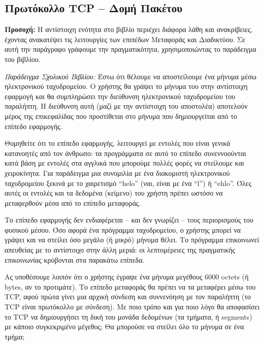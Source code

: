 %
%
\subsection{Πρωτόκολλο TCP -- Δομή Πακέτου}

\begin{inthebox}
\textbf{Προσοχή:} Η αντίστοιχη ενότητα στο βιβλίο περιέχει διάφορα λάθη και ανακρίβειες, έχοντας ανακατέψει τις λειτουργίες των επιπέδων Μεταφοράς και Διαδικτύου. Σε αυτή την παράγραφο γράφουμε την πραγματικότητα, χρησιμοποιώντας το παράδειγμα του βιβλίου.\\
\end{inthebox}


\emph{Παράδειγμα Σχολικού Βιβλίου:} Έστω ότι θέλουμε να αποστείλουμε ένα μήνυμα μέσω ηλεκτρονικού ταχυδρομείου. Ο χρήστης θα γράψει το μήνυμα του στην αντίστοιχη εφαρμογή και θα συμπληρώσει την διεύθυνση ηλεκτρονικού ταχυδρομείου του παραλήπτη. Η διεύθυνση αυτή (μαζί με την αντίστοιχη του αποστολέα) αποτελούν μέρος της επικεφαλίδας που προστίθεται στο μήνυμα που δημιουργείται από το επίπεδο εφαρμογής.

Θυμηθείτε ότι το επίπεδο εφαρμογής, λειτουργεί με εντολές που είναι γενικά κατανοητές από τον άνθρωπο: τα προγράμματα σε αυτό το επίπεδο συνεννοούνται κατά βάση με εντολές στα αγγλικά που μπορούμε πολλές φορές να στείλουμε και χειροκίνητα. Για παράδειγμα μια συνομιλία με ένα διακομιστή ηλεκτρονικού ταχυδρομείου ξεκινά με το χαιρετισμό ``helo'' (ναι, είναι με ένα ``l'') ή ``ehlo''. Όλες αυτές οι εντολές και τα δεδομένα (κείμενο) του χρήστη πρέπει ωστόσο να μεταφερθούν μέσα από το επίπεδο μεταφοράς.

Το επίπεδο εφαρμογής δεν ενδιαφέρεται -- και δεν γνωρίζει -- τους περιορισμούς του φυσικού μέσου. Όσο αφορά ένα πρόγραμμα ταχυδρομείου, ο χρήστης μπορεί να γράψει και να στείλει όσο μεγάλο (ή μικρό) μήνυμα θέλει. Το πρόγραμμα επικοινωνεί απευθείας με το αντίστοιχο στην άλλη μεριά: οι λεπτομέρειες της πραγματικής επικοινωνίας κρύβονται στα παρακάτω επίπεδα.

Ας υποθέσουμε λοιπόν ότι ο χρήστης έγραψε ένα μήνυμα μεγέθους 6000 octets (ή bytes, αν το προτιμάτε). Το επίπεδο μεταφοράς θα πρέπει να τα μεταφέρει μέσω του TCP, αφού πρώτα γίνει μια αρχική σύνδεση και συννενόηση με τον παραλήπτη (το TCP είναι πρωτόκολλο με σύνδεση). Με ποιο τρόπο και για ποιο λόγο θα αποφασίσει το TCP να δημιουργήσει τη δική του μονάδα δεδομένων (τα τμήματα, ή segments) με κάποιο συγκεκριμένο μέγεθος; Θα μπορούσε να στείλει όλο το μήνυμα σε ένα τμήμα;

